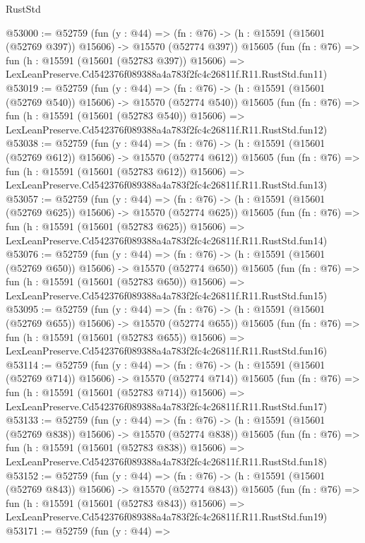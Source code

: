 \begin{lexlean}{RustStd}
\begin{coremodule}
@53000 := @52759
    (fun (y : @44) =>
    (fn : @76) -> (h : @15591 (@15601 (@52769 @397)) @15606) -> @15570 (@52774 @397))
    @15605
    (fun (fn : @76) =>
    fun (h : @15591 (@15601 (@52783 @397)) @15606) =>
    LexLeanPreserve.Cd542376f089388a4a783f2fc4c26811f.R11.RustStd.fun11)
@53019 := @52759
    (fun (y : @44) =>
    (fn : @76) -> (h : @15591 (@15601 (@52769 @540)) @15606) -> @15570 (@52774 @540))
    @15605
    (fun (fn : @76) =>
    fun (h : @15591 (@15601 (@52783 @540)) @15606) =>
    LexLeanPreserve.Cd542376f089388a4a783f2fc4c26811f.R11.RustStd.fun12)
@53038 := @52759
    (fun (y : @44) =>
    (fn : @76) -> (h : @15591 (@15601 (@52769 @612)) @15606) -> @15570 (@52774 @612))
    @15605
    (fun (fn : @76) =>
    fun (h : @15591 (@15601 (@52783 @612)) @15606) =>
    LexLeanPreserve.Cd542376f089388a4a783f2fc4c26811f.R11.RustStd.fun13)
@53057 := @52759
    (fun (y : @44) =>
    (fn : @76) -> (h : @15591 (@15601 (@52769 @625)) @15606) -> @15570 (@52774 @625))
    @15605
    (fun (fn : @76) =>
    fun (h : @15591 (@15601 (@52783 @625)) @15606) =>
    LexLeanPreserve.Cd542376f089388a4a783f2fc4c26811f.R11.RustStd.fun14)
@53076 := @52759
    (fun (y : @44) =>
    (fn : @76) -> (h : @15591 (@15601 (@52769 @650)) @15606) -> @15570 (@52774 @650))
    @15605
    (fun (fn : @76) =>
    fun (h : @15591 (@15601 (@52783 @650)) @15606) =>
    LexLeanPreserve.Cd542376f089388a4a783f2fc4c26811f.R11.RustStd.fun15)
@53095 := @52759
    (fun (y : @44) =>
    (fn : @76) -> (h : @15591 (@15601 (@52769 @655)) @15606) -> @15570 (@52774 @655))
    @15605
    (fun (fn : @76) =>
    fun (h : @15591 (@15601 (@52783 @655)) @15606) =>
    LexLeanPreserve.Cd542376f089388a4a783f2fc4c26811f.R11.RustStd.fun16)
@53114 := @52759
    (fun (y : @44) =>
    (fn : @76) -> (h : @15591 (@15601 (@52769 @714)) @15606) -> @15570 (@52774 @714))
    @15605
    (fun (fn : @76) =>
    fun (h : @15591 (@15601 (@52783 @714)) @15606) =>
    LexLeanPreserve.Cd542376f089388a4a783f2fc4c26811f.R11.RustStd.fun17)
@53133 := @52759
    (fun (y : @44) =>
    (fn : @76) -> (h : @15591 (@15601 (@52769 @838)) @15606) -> @15570 (@52774 @838))
    @15605
    (fun (fn : @76) =>
    fun (h : @15591 (@15601 (@52783 @838)) @15606) =>
    LexLeanPreserve.Cd542376f089388a4a783f2fc4c26811f.R11.RustStd.fun18)
@53152 := @52759
    (fun (y : @44) =>
    (fn : @76) -> (h : @15591 (@15601 (@52769 @843)) @15606) -> @15570 (@52774 @843))
    @15605
    (fun (fn : @76) =>
    fun (h : @15591 (@15601 (@52783 @843)) @15606) =>
    LexLeanPreserve.Cd542376f089388a4a783f2fc4c26811f.R11.RustStd.fun19)
@53171 := @52759
    (fun (y : @44) =>

\end{coremodule}
\end{lexlean}
